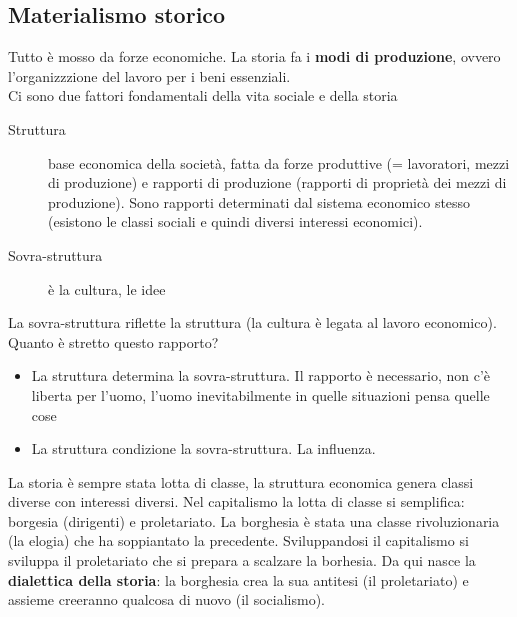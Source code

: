 \subsection{Materialismo storico}
Tutto è mosso da forze economiche. La storia fa i \textbf{modi di produzione}, ovvero l'organizzzione
del lavoro per i beni essenziali.\\
Ci sono due fattori fondamentali della vita sociale e della storia
\begin{description}
  \item[Struttura] base economica della società, fatta da forze produttive (= lavoratori, mezzi di
    produzione) e rapporti di produzione (rapporti di proprietà dei mezzi di produzione). Sono
    rapporti determinati dal sistema economico stesso (esistono le classi sociali e quindi diversi
    interessi economici).
  \item[Sovra-struttura] è la cultura, le idee
\end{description}
La sovra-struttura riflette la struttura (la cultura è legata al lavoro economico). Quanto è stretto
questo rapporto?
\begin{itemize}
  \item La struttura determina la sovra-struttura. Il rapporto è necessario, non c'è liberta per
    l'uomo, l'uomo inevitabilmente in quelle situazioni pensa quelle cose
  \item La struttura condizione la sovra-struttura. La influenza.
\end{itemize}
La storia è sempre stata lotta di classe, la struttura economica genera classi diverse con interessi
diversi. Nel capitalismo la lotta di classe si semplifica: borgesia (dirigenti) e proletariato.
La borghesia è stata una classe rivoluzionaria (la elogia) che ha soppiantato la precedente.
Sviluppandosi il capitalismo si sviluppa il proletariato che si prepara a scalzare la borhesia. Da
qui nasce la \textbf{dialettica della storia}: la borghesia crea la sua antitesi (il proletariato)
e assieme creeranno qualcosa di nuovo (il socialismo).

